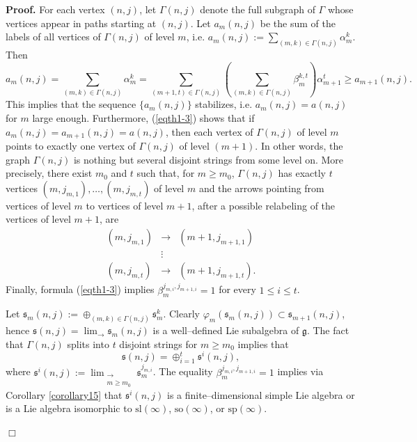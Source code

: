 \documentclass[oneside,leqno,12pt]{article}
\newenvironment{proof}{ \noindent \textbf{Proof.}}{\hfill $\Box$}
\def\gg{\mathfrak{g}}
\renewcommand{\ss}{\mathfrak{s}}
\renewcommand{\gg}{\mathfrak{g}}
\renewcommand {\phi} {\varphi}
\newcommand{\refeq}[1]{(\ref{#1})}
\renewcommand{\sp}{\mathrm{sp}}
\renewcommand{\sl}{\mathrm{sl}}
\newcommand{\so}{\mathrm{so}}
\begin{document}
\begin{proof}
For each vertex $(n,j)$, let $\Gamma(n,j)$ denote the full subgraph of $\Gamma$ whose vertices appear in paths starting at $(n,j)$.
Let  $a_m(n,j)$ be the sum of the labels of all vertices of $\Gamma(n,j)$ of level $m$, i.e.
$a_m(n,j):=\sum_{(m,k)\in \Gamma(n,j)}\alpha_m^k$. Then
\begin{equation}
\label{eqth1-3}a_m(n,j)=\sum_{(m,k)\in\Gamma(n,j)}\alpha_m^k=\sum_{(m+1,t)\in\Gamma(n,j)}\left(\sum_{(m,k)\in\Gamma(n,j)} \beta_m^{k,t}\right)\alpha_{m+1}^t\geq a_{m+1}(n,j).
\end{equation}
This implies that the sequence $\{a_m(n,j)\}$ stabilizes, i.e. $a_m(n,j)=a(n,j)$ for $m$ large enough. Furthermore, \refeq{eqth1-3} shows that if $a_m(n,j)=a_{m+1}(n,j)=a(n,j)$, then each vertex  of $\Gamma(n,j)$ of level $m$ points to exactly one vertex of $\Gamma(n,j)$ of level $(m+1)$.
 In other words, the graph $\Gamma(n,j)$ is nothing but several disjoint strings from some level on.
More precisely, there exist $m_0$ and $t$ such that, for $m \geq m_0$, $\Gamma(n,j)$ has exactly $t$ vertices $(m,j_{m,1}),\dots,(m,j_{m,t})$ of level $m$
and the arrows pointing from vertices of level $m$ to vertices of level $m+1$, after a possible relabeling of the vertices of level $m+1$,
 are \[\begin{array}{lll}(m,j_{m,1})&\to& (m+1,j_{m+1,1})\\&\vdots& \\ (m,j_{m,t})&\to &(m+1,j_{m+1,t}).\end{array}\] 
 Finally, formula \refeq{eqth1-3} implies $\beta_m^{j_{m,i},j_{m+1,i}}=1$ for every $1\leq i\leq t$.

Let $\ss_m(n,j):=\oplus_{(m,k)\in\Gamma(n,j)}\ss_m^k$. Clearly $\phi_m(\ss_m(n,j))\subset\ss_{m+1}(n,j)$, hence $\displaystyle \ss(n,j)= \lim_\to \ss_m(n,j)$ is a well--defined Lie subalgebra of $\gg$. 
The fact that $\Gamma(n,j)$ splits into $t$ disjoint strings for $m\geq m_0$ implies that 
\[
\ss(n,j)=\oplus_{i=1}^t\ss^i(n,j),
\]
where $\ss^i(n,j):=\displaystyle\lim_{\substack{\to\\m\geq m_0}}\ss_m^{j_{m,i}}$. The equality $\beta_m^{j_{m,i},j_{m+1,i}}=1$ implies via Corollary 
\ref{corollary15}  that $\ss^i(n,j)$ is a 
finite--dimensional simple Lie algebra or is a Lie algebra isomorphic to $\sl(\infty)$, $\so(\infty)$, or $\sp(\infty)$. 


\end{proof}
\end{document}
